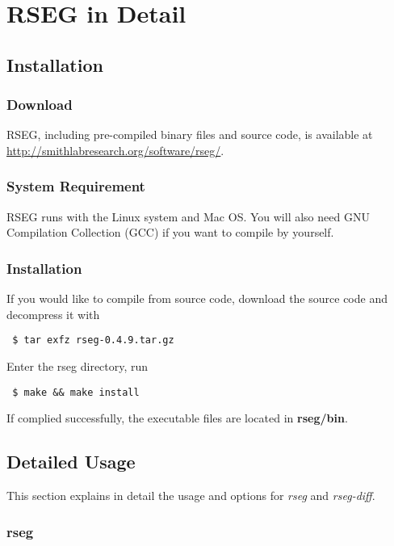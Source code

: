 \documentclass[11pt]{report}
\begin{document}
\chapter{RSEG in Detail}
\label{chap:rseg-manual}

\section{Installation}
\label{sec:install}

\subsection*{Download}

RSEG, including pre-compiled binary files and source code, is
available at \url{http://smithlabresearch.org/software/rseg/}.

\subsection*{System Requirement}

RSEG runs with the Linux system and Mac OS. You will also need GNU
Compilation Collection (GCC) if you want to compile by yourself.

\subsection*{Installation}

If you would like to compile from source code, download the source
code and decompress it with
\begin{verbatim}
 $ tar exfz rseg-0.4.9.tar.gz
\end{verbatim}
%
Enter the rseg directory, run
\begin{verbatim}
 $ make && make install
\end{verbatim}
If complied successfully, the executable files are located in \textbf{rseg/bin}.

\section{Detailed Usage}
\label{sec:usage-detail}

This section explains in detail the usage and options for
\textit{rseg} and \textit{rseg-diff}.

\subsection{rseg}
\label{sec:rseg-detail}
\end{document}

